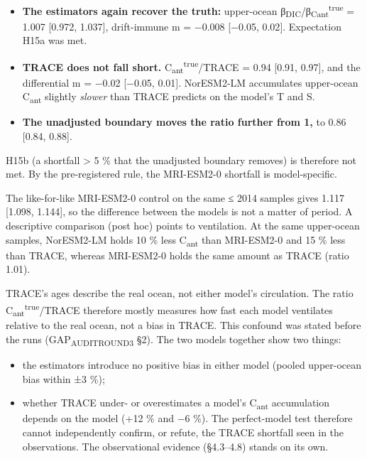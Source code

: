\documentclass[11pt]{article}
\providecommand{\tightlist}{\setlength{\itemsep}{0pt}\setlength{\parskip}{0pt}}
\begin{document}
\begin{itemize}
\tightlist
\item
  \textbf{The estimators again recover the truth:} upper-ocean
  β\textsubscript{DIC}/β\textsubscript{Cant}\textsuperscript{true} =
  1.007 {[}0.972, 1.037{]}, drift-immune m = −0.008 {[}−0.05, 0.02{]}.
  Expectation H15a was met.
\item
  \textbf{TRACE does not fall short.}
  C\textsubscript{ant}\textsuperscript{true}/TRACE = 0.94 {[}0.91,
  0.97{]}, and the differential m = −0.02 {[}−0.05, 0.01{]}. NorESM2-LM
  accumulates upper-ocean C\textsubscript{ant} slightly \emph{slower}
  than TRACE predicts on the model's T and S.
\item
  \textbf{The unadjusted boundary moves the ratio further from 1,} to
  0.86 {[}0.84, 0.88{]}.
\end{itemize}

H15b (a shortfall \textgreater{} 5 \% that the unadjusted boundary
removes) is therefore not met. By the pre-registered rule, the
MRI-ESM2-0 shortfall is model-specific.

The like-for-like MRI-ESM2-0 control on the same ≤ 2014 samples gives
1.117 {[}1.098, 1.144{]}, so the difference between the models is not a
matter of period. A descriptive comparison (post hoc) points to
ventilation. At the same upper-ocean samples, NorESM2-LM holds 10 \%
less C\textsubscript{ant} than MRI-ESM2-0 and 15 \% less than TRACE,
whereas MRI-ESM2-0 holds the same amount as TRACE (ratio 1.01).

TRACE's ages describe the real ocean, not either model's circulation.
The ratio C\textsubscript{ant}\textsuperscript{true}/TRACE therefore
mostly measures how fast each model ventilates relative to the real
ocean, not a bias in TRACE. This confound was stated before the runs
(GAP\textsubscript{AUDITROUND3} §2). The two models together show two
things:

\begin{itemize}
\tightlist
\item
  the estimators introduce no positive bias in either model (pooled
  upper-ocean bias within ±3 \%);
\item
  whether TRACE under- or overestimates a model's C\textsubscript{ant}
  accumulation depends on the model (+12 \% and −6 \%). The
  perfect-model test therefore cannot independently confirm, or refute,
  the TRACE shortfall seen in the observations. The observational
  evidence (§4.3--4.8) stands on its own.
\end{itemize}
\end{document}
